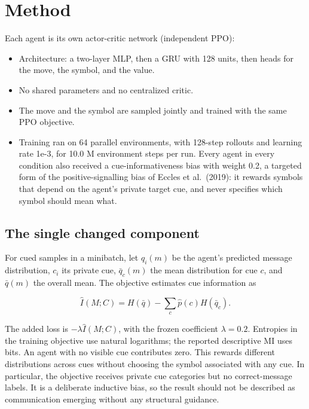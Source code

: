 \section{Method}\label{method}

Each agent is its own actor-critic network (independent PPO):

\begin{itemize}
\tightlist
\item
  Architecture: a two-layer MLP, then a GRU with 128 units, then heads
  for the move, the symbol, and the value.
\item
  No shared parameters and no centralized critic.
\item
  The move and the symbol are sampled jointly and trained with the same
  PPO objective.
\item
  Training ran on 64 parallel environments, with 128-step rollouts and
  learning rate 1e-3, for 10.0 M environment steps per run. Every agent
  in every condition also received a cue-informativeness bias with
  weight 0.2, a targeted form of the positive-signalling bias of Eccles
  et al.~(2019): it rewards symbols that depend on the agent's private
  target cue, and never specifies which symbol should mean what.
\end{itemize}

\subsection{The single changed
component}\label{the-single-changed-component}

For cued samples in a minibatch, let \(q_i(m)\) be the agent's predicted
message distribution, \(c_i\) its private cue, \(\bar q_c(m)\) the mean
distribution for cue \(c\), and \(\bar q(m)\) the overall mean. The
objective estimates cue information as

\[\widehat I(M;C)=H(\bar q)-\sum_c \widehat p(c)H(\bar q_c).\]

The added loss is \(-\lambda\widehat I(M;C)\), with the frozen
coefficient \(\lambda=0.2\). Entropies in the training objective use
natural logarithms; the reported descriptive MI uses bits. An agent with
no visible cue contributes zero. This rewards different distributions
across cues without choosing the symbol associated with any cue. In
particular, the objective receives private cue categories but no
correct-message labels. It is a deliberate inductive bias, so the result
should not be described as communication emerging without any structural
guidance.

